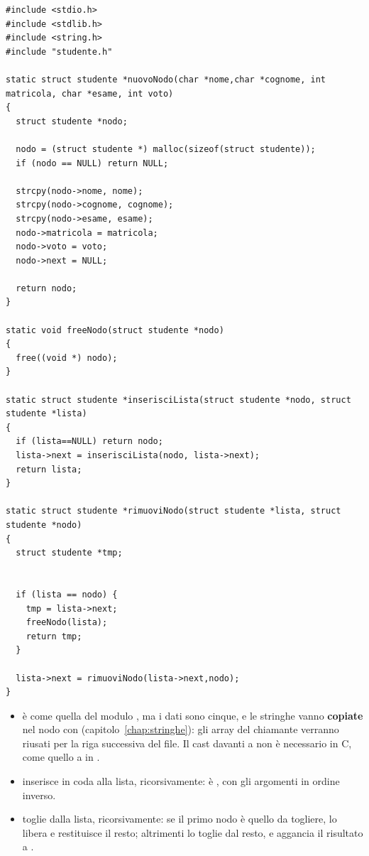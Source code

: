 \begin{lstlisting}[style=c, name=funzioni.c]
#include <stdio.h>
#include <stdlib.h>
#include <string.h>
#include "studente.h"

static struct studente *nuovoNodo(char *nome,char *cognome, int matricola, char *esame, int voto)
{
  struct studente *nodo;

  nodo = (struct studente *) malloc(sizeof(struct studente));
  if (nodo == NULL) return NULL;

  strcpy(nodo->nome, nome);
  strcpy(nodo->cognome, cognome);
  strcpy(nodo->esame, esame);
  nodo->matricola = matricola;
  nodo->voto = voto;
  nodo->next = NULL;

  return nodo;
}

static void freeNodo(struct studente *nodo)
{
  free((void *) nodo);
}

static struct studente *inserisciLista(struct studente *nodo, struct studente *lista)
{
  if (lista==NULL) return nodo;
  lista->next = inserisciLista(nodo, lista->next);
  return lista;
}

static struct studente *rimuoviNodo(struct studente *lista, struct studente *nodo)
{
  struct studente *tmp;


  if (lista == nodo) {
    tmp = lista->next;
    freeNodo(lista);
    return tmp;
  }

  lista->next = rimuoviNodo(lista->next,nodo);
}
\end{lstlisting}

\begin{itemize}
  \item {} è come quella del modulo , ma i dati
        sono cinque, e le stringhe vanno \textbf{copiate} nel nodo con
         (capitolo~\ref{chap:stringhe}): gli array del
        chiamante verranno riusati per la riga successiva del file. Il cast
         davanti a  non è necessario
        in C, come quello a  in .
  \item {} inserisce  in coda alla lista,
        ricorsivamente: è , con gli argomenti in
        ordine inverso.
  \item {} toglie  dalla lista, ricorsivamente:
        se il primo nodo è quello da togliere, lo libera e restituisce il
        resto; altrimenti lo toglie dal resto, e aggancia il risultato a
        .
\end{itemize}


